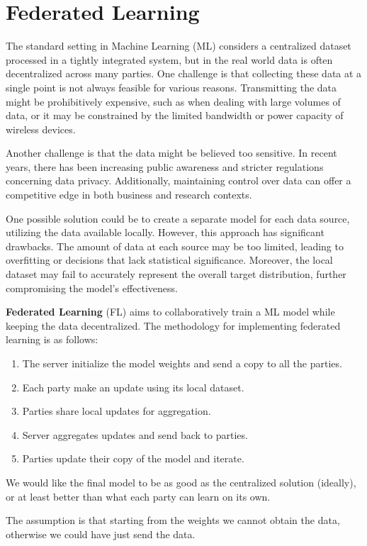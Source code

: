 \chapter{Federated Learning}
The standard setting in Machine Learning (ML) considers a centralized dataset processed in a tightly integrated system,
but in the real world data is often decentralized across many parties. One challenge is that collecting these data at a
single point is not always feasible for various reasons. Transmitting the data might be prohibitively expensive, such 
as when dealing with large volumes of data, or it may be constrained by the limited bandwidth or power capacity of 
wireless devices.

Another challenge is that the data might be believed too sensitive. In recent years, there has been increasing public
awareness and stricter regulations concerning data privacy. Additionally, maintaining control over data can offer a
competitive edge in both business and research contexts.

One possible solution could be to create a separate model for each data source, utilizing the data available locally.
However, this approach has significant drawbacks. The amount of data at each source may be too limited, leading to 
overfitting or decisions that lack statistical significance. Moreover, the local dataset may fail to accurately represent
the overall target distribution, further compromising the model's effectiveness.

\textbf{Federated Learning} (FL) aims to collaboratively train a ML model while keeping the data decentralized. The 
methodology for implementing federated learning is as follows:
\begin{enumerate}
    \item The server initialize the model weights and send a copy to all the parties.
    \item Each party make an update using its local dataset.
    \item Parties share local updates for aggregation.
    \item Server aggregates updates and send back to parties.
    \item Parties update their copy of the model and iterate.
\end{enumerate}

We would like the final model to be as good as the centralized solution (ideally), or at least better 
than what each party can learn on its own.

\begin{note}
    The assumption is that starting from the weights we cannot obtain the data, otherwise we could have just send the
    data.
\end{note}

